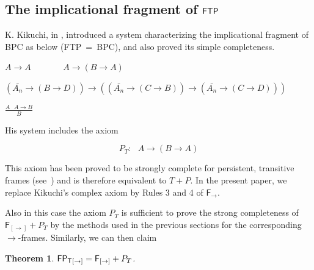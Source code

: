 \documentclass[12pt]{article}
\newtheorem{thm}{Theorem}[section]
\newtheorem{lem}[thm]{Lemma}
\begin{document}
\subsection{The implicational fragment of $ {\sf FTP}  $}

K. Kikuchi, in \cite{Kent}, introduced a system characterizing the implicational fragment of {\sf BPC} as below ({\sf FTP}~=~{\sf BPC}), and also proved its simple completeness. 

$ A\rightarrow A ~~~~~~~~~~~~~~~~~A\rightarrow (B\rightarrow A) $

$( \bar{A_{n}} \rightarrow (B\rightarrow D ))\rightarrow ((\bar{A_{n}}\rightarrow (C\rightarrow B))\rightarrow (\bar{A_{n}}\rightarrow (C\rightarrow D )))$

$ \frac{A ~~~ A\rightarrow B}{B} $

\noindent His system includes the axiom 

$$ P_{T}:~~~ A\rightarrow (B\rightarrow A)$$

This axiom has been proved to be strongly complete for persistent, transitive frames (see~\cite{DF2}) and is therefore equivalent to $T + P$. In the present paper, we replace Kikuchi's complex axiom by Rules 3 and 4 of $\mathsf{F_\rightarrow}$.


Also in this case the axiom $P_T$ is sufficient to prove the strong completeness of ${\mathsf F_{[\rightarrow]}}+P_T$ by the methods used in the previous sections for the corresponding $\rightarrow$-frames. Similarly, we can then claim

\begin{thm}
$\mathsf{ FP_{T}}_{[\rightarrow]}={\sf F}_{[\rightarrow]}+ P_{T}$.
\end{thm}

\end{document}
